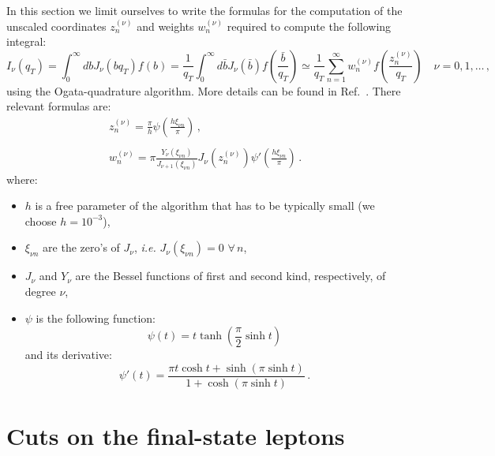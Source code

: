\documentclass[10pt,a4paper]{article}
\begin{document}
In this section we limit ourselves to write the formulas for the
computation of the unscaled coordinates $z_n^{(\nu)}$ and weights
$w_n^{(\nu)}$ required to compute the following integral:
\begin{equation}\label{eq:OgataQuadMast}
I_\nu(q_T)=\int_0^\infty db J_\nu(bq_T) f\left(b\right) =
\frac1{q_T}\int_0^\infty d\bar{b} J_\nu(\bar{b})
f\left(\frac{\bar{b}}{q_T}\right) \simeq
\frac{1}{q_T}\sum_{n=1}^\infty
w_n^{(\nu)}f\left(\frac{z_n^{(\nu)}}{q_T}\right)\quad \nu =0,1,\dots\,,
\end{equation}
using the Ogata-quadrature algorithm. More details can be found in
Ref.~\cite{Ogata:quadrature}. There relevant formulas are:
\begin{equation}
\begin{array}{l}
\displaystyle z_n^{(\nu)} = \frac{\pi}{h}  \psi\left(\frac{h\xi_{\nu
  n}}{\pi}\right)\,,\\
\\
\displaystyle w_n^{(\nu)}  = \pi\frac{Y_\nu(\xi_{\nu
  n})}{J_{\nu+1}(\xi_{\nu n})}  J_\nu(z_n^{(\nu)})  \psi'\left(\frac{h\xi_{\nu
  n}}{\pi}\right)\,.
\end{array}
\end{equation}
where:
\begin{itemize}
\item $h$ is a free parameter of the algorithm that has to be
  typically small (we choose $h = 10^{-3}$),
\item $\xi_{\nu n}$ are the zero's of $J_\nu$, \textit{i.e.}
  $J_\nu(\xi_{\nu n}) = 0$ $\forall\, n$,
\item $J_\nu$ and $Y_\nu$ are the Bessel functions of first and second
  kind, respectively, of degree $\nu$,
\item $\psi$ is the following function:
\begin{equation}
\psi(t) = t\tanh\left(\frac{\pi}{2}\sinh t\right)
\end{equation}
and its derivative:
\begin{equation}
\psi'(t) =  \frac{\pi t \cosh t + \sinh( \pi \sinh t ) }{1 +
  \cosh( \pi \sinh t  ) }\,.
\end{equation}
\end{itemize}

\section{Cuts on the final-state leptons}
\end{document}
